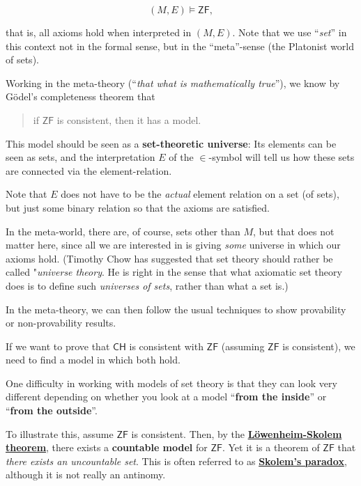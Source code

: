 \documentclass{article}
\newcommand{\ZF}{\mathsf{ZF}}
\newcommand{\CH}{\mathsf{CH}}
\begin{document}
\begin{equation}
(M,E) \models \ZF,
\end{equation}

that is, all axioms hold when interpreted in $(M,E)$. Note that we use ``\textit{set}'' in this context not in the formal sense, but in the ``meta''-sense (the Platonist world of sets).

Working in the meta-theory (``\textit{that what is mathematically true}''), we know by Gödel's completeness theorem that

\begin{quote}
if $\ZF$ is consistent, then it has a model.
\end{quote}

This model should be seen as a \textbf{set-theoretic universe}: Its elements can be seen as sets, and the interpretation  $E$ of the $\in$-symbol will tell us how these sets are connected via the element-relation.

Note that $E$ does not have to be the \textit{actual} element relation on a set (of sets), but just some binary relation so that the axioms are satisfied.

In the meta-world, there are, of course, sets other than $M$, but that does not matter here, since all we are interested in is giving \textit{some} universe in which our axioms hold. (Timothy Chow has suggested that set theory should rather be called "\textit{universe theory}. He is right in the sense that what axiomatic set theory does is to define such \textit{universes of sets}, rather than what a set is.)

In the meta-theory, we can then follow the usual techniques to show provability or non-provability results.

If we want to prove that $\CH$ is consistent with $\ZF$ (assuming $\ZF$ is consistent), we need to find a model in which both hold.

One difficulty in working with models of set theory is that they can look very different depending on whether you look at a model ``\textbf{from the inside}'' or ``\textbf{from the outside}''.

To illustrate this, assume $\ZF$ is consistent. Then, by the \textbf{\href{https://en.wikipedia.org/wiki/L\%C3\%B6wenheim\%E2\%80\%93Skolem\_theorem}{Löwenheim-Skolem theorem}}, there exists a \textbf{countable model} for $\ZF$.
Yet it is a theorem of $\ZF$ that \textit{there exists an uncountable set}. This is often referred to as \textbf{\href{https://en.wikipedia.org/wiki/Skolem's\_paradox}{Skolem's paradox}}, although it is not really an antinomy.
\end{document}
